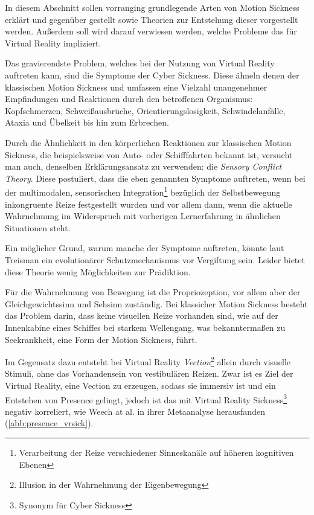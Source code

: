 In diesem Abschnitt sollen vorranging grundlegende Arten von Motion Sickness erkl\"art und gegen\"uber gestellt sowie Theorien zur Entstehung dieser vorgestellt werden. Au{\ss}erdem soll wird darauf verwiesen werden, welche Probleme das f\"ur Virtual Reality impliziert.

Das gravierendste Problem, welches bei der Nutzung von Virtual Reality auftreten kann, sind die Symptome der Cyber Sickness. Diese \"ahneln denen der klassischen Motion Sickness und umfassen eine Vielzahl unangenehmer Empfindungen und Reaktionen durch den betroffenen Organismus: Kopfschmerzen, Schwei{\ss}ausbr\"uche, Orientierungslosigkeit, Schwindelanf\"alle, Ataxia und \"Ubelkeit bis hin zum Erbrechen\cite{LaViola:2000:CSinVR, Kolasinski:1998:SympCS}.

Durch die \"Ahnlichkeit in den k\"orperlichen Reaktionen zur klassischen Motion Sickness, die beispielsweise von Auto- oder Schifffahrten bekannt ist, versucht man auch, denselben Erkl\"arungsansatz zu verwenden: die \textit{Sensory Conflict Theory}\cite{Kolasinski:1998:SympCS,Johnson:2005:SCT_Expl}.
Diese postuliert, dass die eben genannten Symptome auftreten, wenn bei der multimodalen, sensorischen Integration\footnote{ Verarbeitung der Reize verschiedener Sinneskan\"ale auf h\"oheren kognitiven Ebenen} bez\"uglich der Selbstbewegung inkongruente Reize festgestellt wurden und vor allem dann, wenn die aktuelle Wahrnehmung im Widerspruch mit vorherigen Lernerfahrung in \"ahnlichen Situationen steht\cite{Reason:1975:MSexp}.

Ein m\"oglicher Grund, warum manche der Symptome auftreten, k\"onnte laut Treisman\cite{Treisman:1977:Toxic} ein evolution\"arer Schutzmechanismus vor Vergiftung sein. Leider bietet diese Theorie wenig M\"oglichkeiten zur Pr\"adiktion.

F\"ur die Wahrnehmung von Bewegung ist die Propriozeption, vor allem aber der Gleichgewichtssinn und Sehsinn zust\"andig.
Bei klassicher Motion Sickness besteht das Problem darin, dass keine visuellen Reize vorhanden sind, wie auf der Innenkabine eines Schiffes bei starkem Wellengang, was bekannterma{\ss}en zu Seekrankheit, eine Form der Motion Sickness, f\"uhrt.

Im Gegensatz dazu entsteht bei Virtual Reality \textit{Vection}\footnote{ Illusion in der Wahrnehmung der Eigenbewegung} allein durch visuelle Stimuli, ohne das Vorhandensein von vestibul\"aren Reizen.
Zwar ist es Ziel der Virtual Reality, eine Vection zu erzeugen, sodass sie immersiv ist und ein Entstehen von Presence gelingt, jedoch ist das mit Virtual Reality Sickness\footnote{Synonym f\"ur Cyber Sickness} negativ korreliert, wie Weech at al.\cite{Weech:2019:PresenceCS} in ihrer Metaanalyse herausfanden (\autoref{abb:presence_vrsick}).

